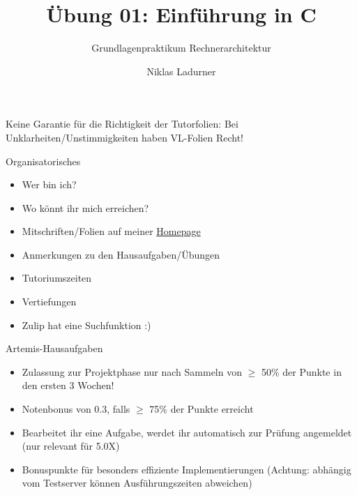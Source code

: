 \documentclass[
  german,            %
  aspectratio=169,    %
]{tumbeamer}
\title{Übung 01: Einführung in C}
\subtitle{Grundlagenpraktikum Rechnerarchitektur}
\author{Niklas Ladurner}
\institute{\theChairName\\\theDepartmentName\\\theUniversityName}
\date{\DTMdisplaydate{2024}{4}{19}{-1}}
\begin{document}
\maketitle

\begin{frame}[c]{}{}
  \begin{center}
    \LARGE  Keine Garantie für die Richtigkeit der Tutorfolien: Bei Unklarheiten/Unstimmigkeiten
    haben VL-Folien Recht!
  \end{center}
\end{frame}

\begin{frame}[c]{Organisatorisches}{}
  \begin{itemize}
    \item Wer bin ich?
    \item Wo könnt ihr mich erreichen?
    \item Mitschriften/Folien auf meiner \href{https://home.in.tum.de/~ladu/}{Homepage}
    \item Anmerkungen zu den Hausaufgaben/Übungen
    \item Tutoriumszeiten
    \item Vertiefungen
    \item Zulip hat eine Suchfunktion :)
  \end{itemize}
\end{frame}

\begin{frame}[c]{Artemis-Hausaufgaben}{}
  \begin{itemize}
    \item Zulassung zur Projektphase nur nach Sammeln von $\ge$ 50\%
          der Punkte in den ersten 3 Wochen!
    \item Notenbonus von 0.3, falls $\ge$ 75\% der Punkte erreicht
    \item Bearbeitet ihr eine Aufgabe, werdet ihr automatisch zur Prüfung
          angemeldet (nur relevant für 5.0X)
    \item Bonuspunkte für besonders effiziente Implementierungen (Achtung: abhängig
          vom Testserver können Ausführungszeiten abweichen)
  \end{itemize}
\end{frame}
\end{document}
